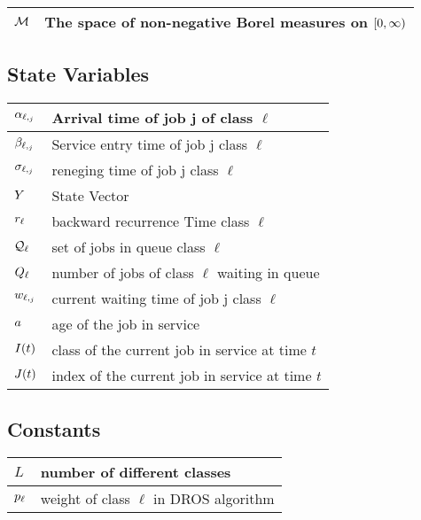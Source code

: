 \documentclass{article}
\theoremstyle{definition}
\numberwithin{equation}{section}
\begin{document}
\begin{center}
\begin{tabular}{ | l | l | }
\hline
$\mathcal{M}$                 & The space of non-negative Borel measures on $[0,\infty)$ \\
\hline
\end{tabular}
\end{center}

\subsection{State Variables}

\begin{center}
\begin{tabular}{ | l | l | }
\hline
$\alpha_{\ell,_j}$           & Arrival time of job j of class $\ell$\\
\hline
$\beta_{\ell,_j}$             & Service entry time of job j class $\ell$ \\
\hline
$\sigma_{\ell,_j}$             & reneging time of job j class $\ell$\\
\hline
$Y$                        & State Vector\\
\hline
$r_{\ell}$                        & backward recurrence Time class $\ell$\\
\hline
$\mathcal{Q}_\ell$                      & set of jobs in queue class $\ell$\\
\hline
$Q_\ell$                         & number of jobs of class $\ell$ waiting in queue\\
\hline
$w_{\ell,_j}$               & current waiting time of job j class $\ell$\\
\hline
$a$                             & age of the job in service\\
\hline
$I(t)$                        & class of the current job in service at time $t$\\
\hline
$J(t)$                         & index of the current job in service at time $t$    \\
\hline
\end{tabular}
\end{center}





\subsection{Constants}


\begin{center}
\begin{tabular}{ | l | l | }
\hline
$L$                               & number of different classes\\
\hline
$p_\ell$                    & weight of class $\ell$ in DROS algorithm\\
\hline
\end{tabular}
\end{center}
\end{document}
